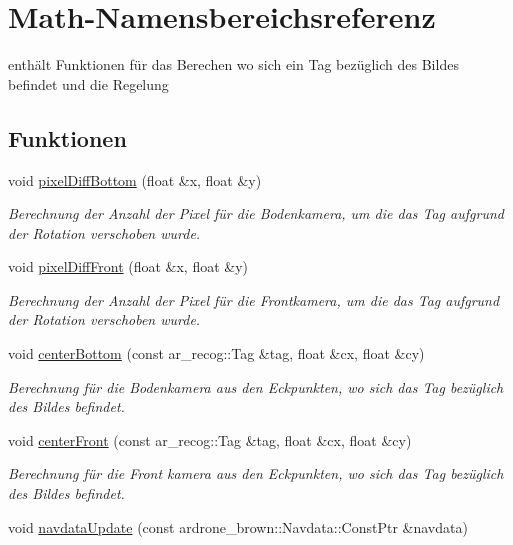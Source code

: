 \hypertarget{namespace_math}{
\section{Math-\/Namensbereichsreferenz}
\label{namespace_math}
}


enthält Funktionen für das Berechen wo sich ein Tag bezüglich des Bildes befindet und die Regelung  


\subsection*{Funktionen}
\begin{DoxyCompactItemize}
\item 
void \hyperlink{namespace_math_a25b9284eb485b732c952786b63343aaa}{pixelDiffBottom} (float \&x, float \&y)
\begin{DoxyCompactList}\small\item\em Berechnung der Anzahl der Pixel für die Bodenkamera, um die das Tag aufgrund der Rotation verschoben wurde. \end{DoxyCompactList}\item 
void \hyperlink{namespace_math_a3fbe7036db847d74ed5f2c21635d02d9}{pixelDiffFront} (float \&x, float \&y)
\begin{DoxyCompactList}\small\item\em Berechnung der Anzahl der Pixel für die Frontkamera, um die das Tag aufgrund der Rotation verschoben wurde. \end{DoxyCompactList}\item 
void \hyperlink{namespace_math_ab4c584467f0cc5d8af22a69482630866}{centerBottom} (const ar\_\-recog::Tag \&tag, float \&cx, float \&cy)
\begin{DoxyCompactList}\small\item\em Berechnung für die Bodenkamera aus den Eckpunkten, wo sich das Tag bezüglich des Bildes befindet. \end{DoxyCompactList}\item 
void \hyperlink{namespace_math_a43f025fac1ade5dbf88f7c393ca85644}{centerFront} (const ar\_\-recog::Tag \&tag, float \&cx, float \&cy)
\begin{DoxyCompactList}\small\item\em Berechnung für die Front kamera aus den Eckpunkten, wo sich das Tag bezüglich des Bildes befindet. \end{DoxyCompactList}\item 
void \hyperlink{namespace_math_ad3b65f0aedda56076f681f2b987d0e5c}{navdataUpdate} (const ardrone\_\-brown::Navdata::ConstPtr \&navdata)

\end{DoxyCompactItemize}
